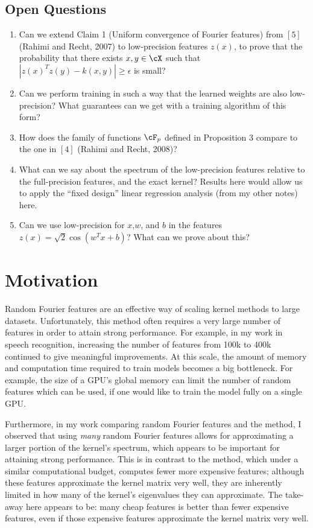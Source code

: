 \documentclass[12pt]{article}
\newcommand{\sq}{\sqrt{2}}
\newcommand{\eps}{\epsilon}
\begin{document}
\subsection{Open Questions}
\begin{enumerate}
	\item Can we extend Claim 1 (Uniform convergence of Fourier features) from $[5]$ (Rahimi and Recht, 2007) to low-precision features $z(x)$, to prove that the probability that there exists $x,y\in\cX$ such that $|z(x)^Tz(y) -k(x,y)| \geq \eps$ is small?
	\item Can we perform training in such a way that the learned weights are also low-precision?  What guarantees can we get with a training algorithm of this form?
	\item How does the family of functions $\cF_p$ defined in Proposition 3 compare to the one in $[4]$ (Rahimi and Recht, 2008)?	
	\item What can we say about the spectrum of the low-precision features relative to the full-precision features, and the exact kernel?  Results here would allow us to apply the ``fixed design'' linear regression analysis (from my other notes) here.
	\item Can we use low-precision for $x$,$w$, and $b$ in the features $z(x) = \sq\cos(w^Tx+b)$?  What can we prove about this?
\end{enumerate}

\section{Motivation}
Random Fourier features are an effective way of scaling kernel methods to large datasets.  Unfortunately, this method often requires a very large number of features in order to attain strong performance.  For example, in my work in speech recognition, increasing the number of features from 100k to 400k continued to give meaningful improvements.  At this scale, the amount of memory and computation time required to train models becomes a big bottleneck. For example, the size of a GPU's global memory can limit the number of random features which can be used, if one would like to train the model fully on a single GPU.  

Furthermore, in my work comparing random Fourier features and the \Nystrom method, I observed that using \textit{many} random Fourier features allows for approximating a larger portion of the kernel's spectrum, which appears to be important for attaining strong performance. This is in contrast to the \Nystrom method, which under a similar computational budget, computes fewer more expensive features; although these features approximate the kernel matrix very well, they are inherently limited in how many of the kernel's eigenvalues they can approximate.  The take-away here appears to be: many cheap features is better than fewer expensive features, even if those expensive features approximate the kernel matrix very well.
\end{document}
